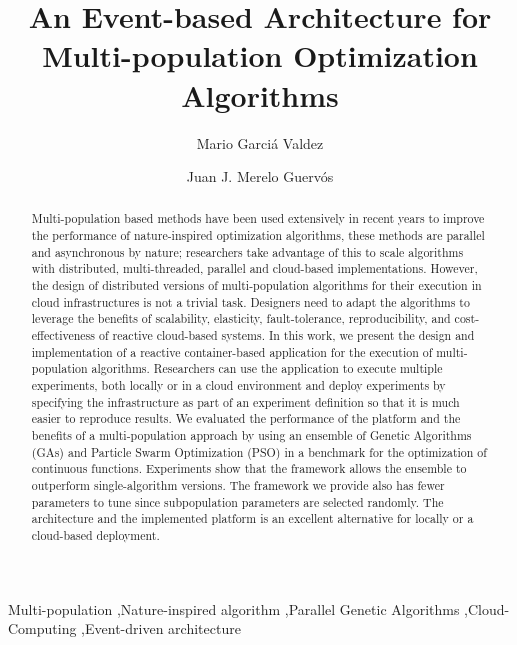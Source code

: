 \documentclass[review]{elsarticle}
\begin{document}
\begin{frontmatter}

\title{An Event-based Architecture for Multi-population Optimization Algorithms}

\author[itt]{Mario Garci\'a Valdez }

\author[granada]{Juan J. Merelo Guerv\'os}

\address[itt]{Department of Graduate Studies, Instituto Tecnol\'ogico de Tijuana, Tijuana BC, Mexico}
\address[granada]{Universidad de Granada, Granada, Spain}

\begin{abstract} 
Multi-population based methods have been used extensively in
recent years to improve the performance of nature-inspired optimization
algorithms, these methods are parallel and asynchronous by nature; researchers
take advantage of this to scale algorithms with distributed, multi-threaded,
parallel and cloud-based implementations. However, the design of distributed
versions of multi-population algorithms for their execution in cloud
infrastructures is not a trivial task. Designers need to adapt the algorithms to
leverage the benefits of scalability, elasticity, fault-tolerance,
reproducibility, and cost-effectiveness of reactive cloud-based systems. In this
work, we present the design and implementation of a reactive container-based
application for the execution of multi-population algorithms. Researchers can
use the application to execute multiple experiments, both locally or in a cloud
environment and deploy experiments by specifying the infrastructure as part of
an experiment definition so that it is much easier to reproduce results. We
evaluated the performance of the platform and the benefits of a multi-population
approach by using an ensemble of Genetic Algorithms (GAs) and Particle Swarm
Optimization (PSO) in a benchmark for the optimization of continuous functions.
Experiments show that the framework allows the ensemble to outperform
single-algorithm versions. The framework we provide also has fewer parameters to
tune since subpopulation parameters are selected randomly. The architecture and
the implemented platform is an excellent alternative for locally or a
cloud-based deployment. 
\end{abstract}

\begin{keyword}
Multi-population \sep Nature-inspired algorithm \sep Parallel Genetic Algorithms \sep Cloud-Computing
\sep Event-driven architecture 
\end{keyword}

\end{frontmatter}
\end{document}
